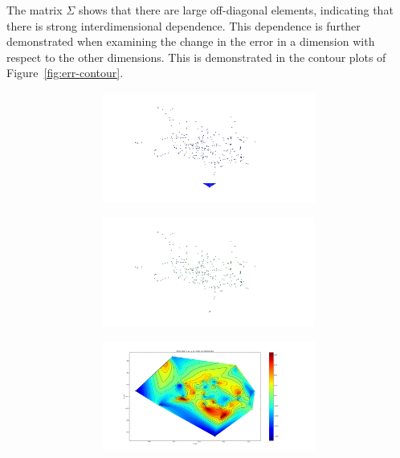 The matrix $\Sigma$ shows that there are large off-diagonal elements, indicating that there is strong interdimensional dependence. This dependence is further demonstrated when examining the change in the error in a dimension with respect to the other dimensions. This is demonstrated in the contour plots of Figure~\ref{fig:err-contour}. 

\begin{figure}
  \centering
  \begin{subfigure}{0.48\textwidth}
    \begin{subfigure}{\textwidth}
      \includegraphics[clip, trim = 70 0 190 0, width=\textwidth]{figures/chapter3/contour_x}
    \end{subfigure}
    \begin{subfigure}{\textwidth}
      \includegraphics[clip, trim = 70 0 190 0, width=\textwidth]{figures/chapter3/contour_y}
    \end{subfigure}
    \begin{subfigure}{\textwidth}
      \includegraphics[clip, trim = 70 0 190 0, width=\textwidth]{figures/chapter3/contour_z}

\end{subfigure}
\end{subfigure}
\end{figure}
